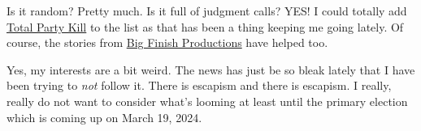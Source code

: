 Is it random? Pretty much. Is it full of judgment calls? YES! I could
totally add \href{http://totalkill.party/}{Total Party Kill} to the list
as that has been a thing keeping me going lately. Of course, the stories
from \href{https://www.bigfinish.com/}{Big Finish Productions} have
helped too.

Yes, my interests are a bit weird. The news has just be so bleak lately
that I have been trying to \emph{not} follow it. There is escapism and
there is escapism. I really, really do not want to consider what's
looming at least until the primary election which is coming up on March
19, 2024.
